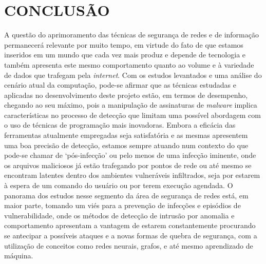 \chapter{CONCLUSÃO}
\label{c.conclusao}

A questão do aprimoramento das técnicas de segurança de redes e de informação
permanecerá relevante por muito tempo, em virtude do fato de que estamos
inseridos em um mundo que cada vez mais produz e depende de tecnologia e também
apresenta este mesmo comportamento quanto ao volume e à variedade de dados que
trafegam pela \textit{internet}. Com os estudos levantados e uma análise do
cenário atual da computação, pode-se afirmar que as técnicas estudadas e
aplicadas no desenvolvimento deste projeto estão, em termos de desempenho,
chegando ao seu máximo, pois a manipulação de assinaturas de \textit{malware}
implica características no processo de detecção que limitam uma possível
abordagem com o uso de técnicas de programação mais inovadoras. Embora a
eficácia das ferramentas atualmente empregadas seja satisfatória e as mesmas
apresentem uma boa precisão de detecção, estamos sempre atuando num contexto do
que pode-se chamar de `pós-infecção' ou pelo menos de uma infecção iminente,
onde os arquivos maliciosos já estão trafegando por pontos de rede ou até mesmo se encontram
latentes dentro dos ambientes vulneráveis infiltrados, seja por estarem à espera de um
comando do usuário ou por terem execução agendada. O panorama dos estudos nesse
segmento da área de segurança de redes está, em maior parte, tomando um viés
para a prevenção de infecções e episódios de vulnerabilidade, onde os métodos de
detecção de intrusão por anomalia e comportamento apresentam a vantagem de
estarem constantemente procurando se antecipar a possíveis ataques e a novas
formas de quebra de segurança, com a utilização de conceitos como redes neurais,
grafos, e até mesmo aprendizado de máquina.

